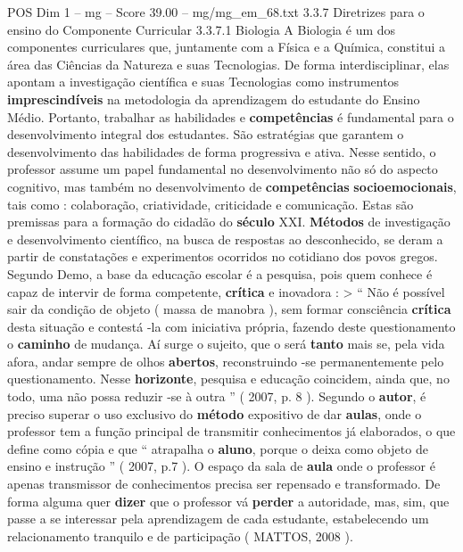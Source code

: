 \begin{textsample}{POS Dim 1 – mg – Score 39.00 – mg/mg\_em\_68.txt}  \label{ex:f1_pos_236}
3.3.7 Diretrizes para o ensino do Componente Curricular 3.3.7.1 Biologia A Biologia é um dos componentes curriculares que, juntamente com a Física e a Química, constitui a área das Ciências da Natureza e suas Tecnologias.
De forma interdisciplinar, elas apontam a investigação científica e suas Tecnologias como instrumentos \textbf{imprescindíveis} na metodologia da aprendizagem do estudante do Ensino Médio.
Portanto, trabalhar as habilidades e \textbf{competências} é fundamental para o desenvolvimento integral dos estudantes.
São estratégias que garantem o desenvolvimento das habilidades de forma progressiva e ativa.
Nesse sentido, o professor assume um papel fundamental no desenvolvimento não só do aspecto cognitivo, mas também no desenvolvimento de \textbf{competências} \textbf{socioemocionais}, tais como : colaboração, criatividade, criticidade e comunicação.
Estas são premissas para a formação do cidadão do \textbf{século} XXI. \textbf{Métodos} de investigação e desenvolvimento científico, na busca de respostas ao desconhecido, se deram a partir de constatações e experimentos ocorridos no cotidiano dos povos gregos.
Segundo Demo, a base da educação escolar é a pesquisa, pois quem conhece é capaz de intervir de forma competente, \textbf{crítica} e inovadora : > “ Não é possível sair da condição de objeto ( massa de manobra ), sem formar consciência \textbf{crítica} desta situação e contestá -la com iniciativa própria, fazendo deste questionamento o \textbf{caminho} de mudança.
Aí surge o sujeito, que o será \textbf{tanto} mais se, pela vida afora, andar sempre de olhos \textbf{abertos}, reconstruindo -se permanentemente pelo questionamento.
Nesse \textbf{horizonte}, pesquisa e educação coincidem, ainda que, no todo, uma não possa reduzir -se à outra ” ( 2007, p. 8 ).
Segundo o \textbf{autor}, é preciso superar o uso exclusivo do \textbf{método} expositivo de dar \textbf{aulas}, onde o professor tem a função principal de transmitir conhecimentos já elaborados, o que define como cópia e que “ atrapalha o \textbf{aluno}, porque o deixa como objeto de ensino e instrução ” ( 2007, p.7 ).
O espaço da sala de \textbf{aula} onde o professor é apenas transmissor de conhecimentos precisa ser repensado e transformado.
De forma alguma quer \textbf{dizer} que o professor vá \textbf{perder} a autoridade, mas, sim, que passe a se interessar pela aprendizagem de cada estudante, estabelecendo um relacionamento tranquilo e de participação ( MATTOS, 2008 ).

\end{textsample}
